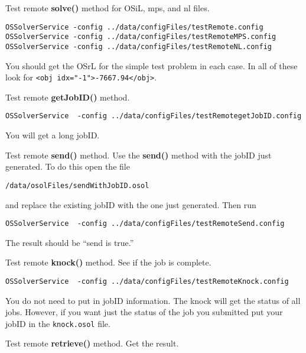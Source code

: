 \begin{itemize}
\begin{itemize}
 Test remote {\bf solve()} method for OSiL, mps, and nl files.



\begin{verbatim}
OSSolverService -config ../data/configFiles/testRemote.config
OSSolverService -config ../data/configFiles/testRemoteMPS.config
OSSolverService -config ../data/configFiles/testRemoteNL.config
\end{verbatim}


You should get the OSrL for the simple test problem in each case.  In all of these look for {\tt <obj idx="-1">-7667.94</obj>}.

\vskip 10pt


 Test remote {\bf getJobID()} method.


\begin{verbatim}
OSSolverService  -config ../data/configFiles/testRemotegetJobID.config
\end{verbatim}



You will get a long jobID.


\vskip 10pt


 Test remote {\bf send()} method. Use the {\bf send()} method with the jobID just  generated.  To do this open the file
\begin{verbatim}
/data/osolFiles/sendWithJobID.osol
\end{verbatim}
and replace the existing jobID with the one just generated.  Then run
\begin{verbatim}
OSSolverService  -config ../data/configFiles/testRemoteSend.config
\end{verbatim}
The result should be ``send is true.''

\vskip 10pt

 Test remote {\bf knock()} method.  See if the  job is complete.


\begin{verbatim}
OSSolverService  -config ../data/configFiles/testRemoteKnock.config
\end{verbatim}

You do not need to put in jobID information. The knock will get the status of all jobs. However, if you want just the status of the job you submitted put your jobID in the {\tt knock.osol} file. 

\vskip 10pt

 Test remote {\bf retrieve()} method. Get the result.


\end{itemize}
\end{itemize}
